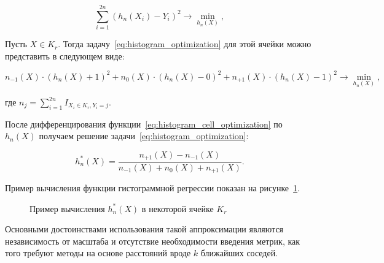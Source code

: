 
\begin{equation}
    \label{eq:histogram_optimization}
    \sum\limits_{i=1}^{2n} (h_n(X_i) - Y_i)^2 \rightarrow \min\limits_{h_n(X)},
\end{equation}

Пусть \(X \in K_r\). Тогда задачу~\cref{eq:histogram_optimization} для этой ячейки можно представить в следующем виде:


\begin{equation}
    \label{eq:histogram_cell_optimization}
    n_{-1}(X)\cdot(h_n(X) + 1)^2 + n_0(X)\cdot(h_n(X) - 0)^2 + n_{+1}(X)\cdot(h_n(X) - 1)^2 \rightarrow \min\limits_{h_n(X)},
\end{equation}

\noindent где \(n_j = \sum\limits_{i=1}^{2n} I_{X_i \in K_r, Y_i = j}\).

После дифференцирования функции~\cref{eq:histogram_cell_optimization} по \(h_n(X)\) получаем решение задачи~\cref{eq:histogram_optimization}:

\begin{equation}
    \label{eq:histogram_cell_solution}
    h_n^*(X) = \frac{n_{+1}(X) - n_{-1}(X)}{n_{-1}(X) + n_0(X) + n_{+1}(X)}.
\end{equation}

Пример вычисления функции гистограммной регрессии показан на рисунке~\cref{fig:histogram_evaluation}.

\begin{figure}[ht]
    \caption{Пример вычисления \(h_n^*(X)\) в некоторой ячейке \(K_r\)}
    \label{fig:histogram_evaluation}
\end{figure}

Основными достоинствами использования такой аппроксимации являются независимость от масштаба и отсутствие необходимости введения метрик, как того требуют методы на основе расстояний вроде \(k\) ближайших соседей.